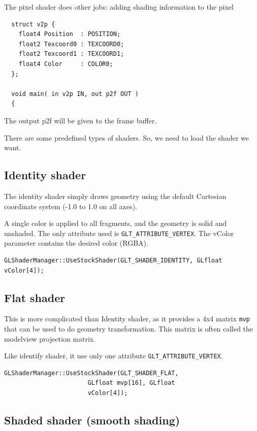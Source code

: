 The pixel shader does other jobs: adding shading information to the pixel
\begin{verbatim}
  struct v2p {
    float4 Position  : POSITION;
    float2 Texcoord0 : TEXCOORD0;
    float2 Texcoord1 : TEXCOORD1;
    float4 Color     : COLOR0;
  };

  void main( in v2p IN, out p2f OUT ) 
  {  
\end{verbatim}
The output p2f will be given to the frame buffer.



There are some predefined types of shaders. So, we need to load the shader we
want.


\subsection{Identity shader}
\label{sec:identity-shader}

The identity shader simply draws geometry using the default Cartesian
coordinate system (-1.0 to 1.0 on all axes).

A single color is applied to all fragments, and the geometry is solid
and unshaded. The only attribute used is
\verb!GLT_ATTRIBUTE_VERTEX!. The vColor parameter contains the desired
color (RGBA).
\begin{verbatim}
GLShaderManager::UseStockShader(GLT_SHADER_IDENTITY, GLfloat vColor[4]);
\end{verbatim}

\subsection{Flat shader}
\label{sec:flat-shader}

This is more complicated than Identity shader, as it provides a 4x4
matrix \verb!mvp! that can be used to do geometry transformation. This
matrix is often called the modelview projection matrix.

Like identify shader, it use only one attribute
\verb!GLT_ATTRIBUTE_VERTEX!.
\begin{verbatim}
GLShaderManager::UseStockShader(GLT_SHADER_FLAT, 
                       GLfloat mvp[16], GLfloat
                       vColor[4]);
\end{verbatim}


\subsection{Shaded shader (smooth shading)}
\label{sec:shaded-shader}

